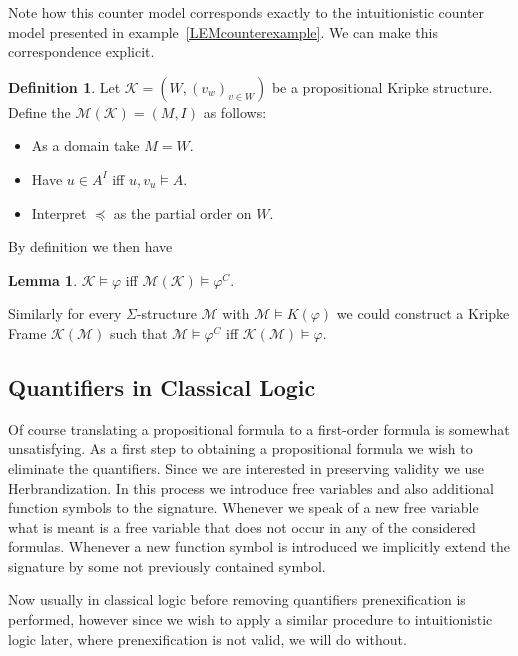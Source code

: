 \documentclass[a4paper,12pt]{report}
\theoremstyle{definition}
\theoremstyle{definition}
\theoremstyle{definition}
\newtheorem{lemma}[theorem]{Lemma}
\theoremstyle{definition}
\theoremstyle{definition}
\newtheorem{definition}[theorem]{Definition}
\theoremstyle{definition}
\theoremstyle{definition}
\begin{document}
	Note how this counter model corresponds exactly to the intuitionistic counter model presented in example~\ref{LEMcounterexample}. We can make this correspondence explicit.
	
	\begin{definition}
		Let $\mathcal K = (W, (v_w)_{v\in W})$ be a propositional Kripke structure. Define the $\mathcal M(\mathcal K) = (M, I)$ as follows:
		\begin{itemize}
			\item As a domain take $M = W$.
			\item Have $u\in A^{I}$ iff $u, v_u\models A$.
			\item Interpret $\preceq$ as the partial order on $W$.
		\end{itemize}
	\end{definition}

	\noindent By definition we then have
	\begin{lemma}
		$\mathcal K\models \varphi$ iff $\mathcal M(\mathcal K)\models \varphi^{C}$.
	\end{lemma}
	
	\indent Similarly for every $\Sigma$-structure $\mathcal M$ with $\mathcal M\models K(\varphi)$ we could construct a Kripke Frame $\mathcal K(\mathcal M)$ such that $\mathcal M\models \varphi^C$ iff $\mathcal K(\mathcal M)\models \varphi$.
	

	\subsection{Quantifiers in Classical Logic}
	
	Of course translating a propositional formula to a first-order formula is somewhat unsatisfying. As a first step to obtaining a propositional formula we wish to eliminate the quantifiers. Since we are interested in preserving validity we use Herbrandization. In this process we introduce free variables and also additional function symbols to the signature. Whenever we speak of a new free variable what is meant is a free variable that does not occur in any of the considered formulas. Whenever a new function symbol is introduced we implicitly extend the signature by some not previously contained symbol.
	
	Now usually in classical logic before removing quantifiers prenexification is performed, however since we wish to apply a similar procedure to intuitionistic logic later, where prenexification is not valid, we will do without.
	
\end{document}
